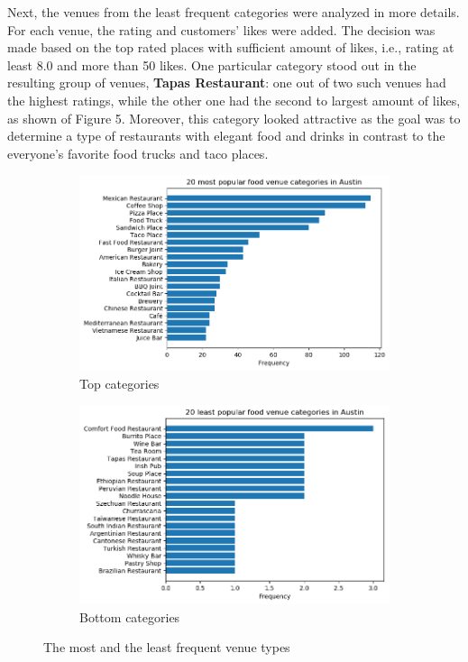 \documentclass[11pt]{article}
\numberwithin{equation}{section}
\begin{document}
Next, the venues from the least frequent categories were analyzed in more details. For each venue, the rating and customers' likes were added. The decision was made based on the top rated places with sufficient amount of likes, i.e., rating at least 8.0 and more than 50 likes. One particular category stood out in the resulting group of venues, {\bf Tapas Restaurant}: one out of two such venues had the highest ratings, while the other one had the second to largest amount of likes, as shown of Figure 5. Moreover, this category looked attractive as the goal was to determine a type of restaurants with elegant food and drinks in contrast to the everyone's favorite food trucks and taco places.
%
\begin{figure}[H]
	\centering
	\begin{subfigure}[b]{0.47\textwidth}
		\includegraphics[width=\textwidth]{pics/top_20_venues}
		\caption{Top categories}
		\label{fig:1_1}
	\end{subfigure}
	\begin{subfigure}[b]{0.47\textwidth}
		\includegraphics[width=\textwidth]{pics/bottom_20_venues}
		\caption{Bottom categories}
		\label{fig:1_2}
	\end{subfigure}
	\caption{The most and the least frequent venue types}
	\label{fig:3}
\end{figure}
\end{document}
